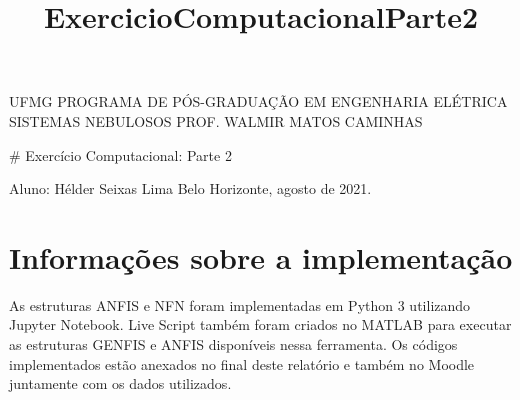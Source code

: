 \documentclass[11pt]{article}
\title{ExercicioComputacionalParte2}
\begin{document}
    
    \maketitle
    
    

    
    UFMG PROGRAMA DE PÓS-GRADUAÇÃO EM ENGENHARIA ELÉTRICA SISTEMAS NEBULOSOS
PROF. WALMIR MATOS CAMINHAS

\# Exercício Computacional: Parte 2

Aluno: Hélder Seixas Lima Belo Horizonte, agosto de 2021.

\hypertarget{informauxe7uxf5es-sobre-a-implementauxe7uxe3o}{%
\section{Informações sobre a
implementação}\label{informauxe7uxf5es-sobre-a-implementauxe7uxe3o}}

As estruturas ANFIS e NFN foram implementadas em Python 3 utilizando
Jupyter Notebook. Live Script também foram criados no MATLAB para
executar as estruturas GENFIS e ANFIS disponíveis nessa ferramenta. Os
códigos implementados estão anexados no final deste relatório e também
no Moodle juntamente com os dados utilizados.
\end{document}
